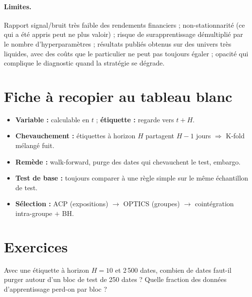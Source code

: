 \paragraph{Limites.} Rapport signal/bruit très faible des rendements financiers ; non-stationnarité (ce qui a été appris peut ne plus valoir) ; risque de surapprentissage démultiplié par le nombre d'hyperparamètres ; résultats publiés obtenus sur des univers très liquides, avec des coûts que le particulier ne peut pas toujours égaler ; opacité qui complique le diagnostic quand la stratégie se dégrade.

\section{Fiche à recopier au tableau blanc}

\begin{whiteboard}
\begin{itemize}[leftmargin=1.2em]
\item \textbf{Variable :} calculable en $t$ ; \textbf{étiquette :} regarde vers $t+H$.
\item \textbf{Chevauchement :} étiquettes à horizon $H$ partagent $H-1$ jours $\Rightarrow$ K-fold mélangé fuit.
\item \textbf{Remède :} walk-forward, purge des dates qui chevauchent le test, embargo.
\item \textbf{Test de base :} toujours comparer à une règle simple sur le même échantillon de test.
\item \textbf{Sélection :} ACP (expositions) $\to$ OPTICS (groupes) $\to$ cointégration intra-groupe $+$ BH.
\end{itemize}
\end{whiteboard}

\section{Exercices}

\begin{exercise}
Avec une étiquette à horizon $H = 10$ et 2\,500 dates, combien de dates faut-il purger autour d'un bloc de test de 250 dates ? Quelle fraction des données d'apprentissage perd-on par bloc ?
\end{exercise}

